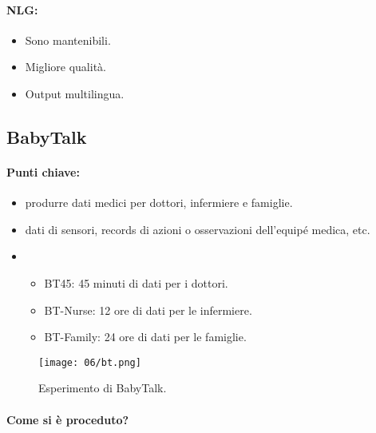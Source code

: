 \paragraph{NLG:}

\begin{itemize}
  \item Sono mantenibili. 
  \item Migliore qualità. 
  \item Output multilingua.
\end{itemize}


\subsection{BabyTalk}


\paragraph{Punti chiave:}

\begin{itemize}
  \item {} produrre dati medici per dottori, infermiere e famiglie. 
  \item {} dati di sensori, records di azioni o osservazioni dell'equipé medica, etc. 
  \item {} 
    \begin{itemize}
      \item BT45: 45 minuti di dati per i dottori. 
      \item BT-Nurse: 12 ore di dati per le infermiere. 
      \item BT-Family: 24 ore di dati per le famiglie.
    \end{itemize}
\end{itemize}

\begin{figure}[h]
    \centering
    \texttt{[image: 06/bt.png]}
    \caption{Esperimento di BabyTalk.}
\end{figure}

\paragraph{Come si è proceduto?}

